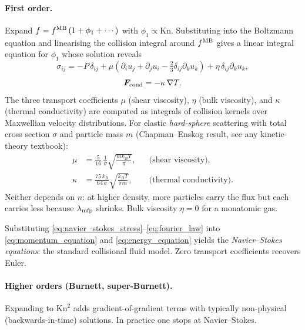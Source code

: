 \documentclass[12pt]{article}
\renewcommand{\vec}[1]{\bm{#1}}
\begin{document}
\paragraph{First order.}  Expand $f = f^{\rm MB}\,(1 + \phi_1 + \cdots)$
with $\phi_1 \propto \mathrm{Kn}$.  Substituting into the Boltzmann
equation and linearising the collision integral around
$f^{\rm MB}$ gives a linear integral equation for $\phi_1$ whose
solution reveals
%
\begin{equation}
  \sigma_{ij} = -P\,\delta_{ij}
    + \mu\!\left(\partial_i u_j + \partial_j u_i
                - \tfrac{2}{3}\delta_{ij}\partial_k u_k\right)
    + \eta\,\delta_{ij}\partial_k u_k,
  \label{eq:navier_stokes_stress}
\end{equation}
%
%
\begin{equation}
  \vec F_{\rm cond} = -\kappa\,\nabla T.
  \label{eq:fourier_law}
\end{equation}
%
The three transport coefficients $\mu$ (shear viscosity),
$\eta$ (bulk viscosity), and $\kappa$ (thermal conductivity) are
computed as integrals of collision kernels over Maxwellian velocity
distributions.  For elastic \emph{hard-sphere} scattering with total
cross section $\sigma$ and particle mass $m$
(Chapman--Enskog result, see any kinetic-theory textbook):
%
\begin{align}
  \mu &= \frac{5}{16}\,\frac{1}{\sigma}\sqrt{\frac{m k_B T}{\pi}},
    &&\text{(shear viscosity)},\\
  \kappa &= \frac{75\,k_B}{64\,\sigma}
             \sqrt{\frac{k_B T}{\pi m}},
    &&\text{(thermal conductivity)}.
  \label{eq:CE_transport}
\end{align}
%
Neither depends on $n$: at higher density, more particles carry the
flux but each carries less because $\lambda_{\rm mfp}$ shrinks.  Bulk
viscosity $\eta = 0$ for a monatomic gas.

Substituting \eqref{eq:navier_stokes_stress}--\eqref{eq:fourier_law}
into \eqref{eq:momentum_equation} and \eqref{eq:energy_equation}
yields the \emph{Navier--Stokes equations}: the standard collisional
fluid model.  Zero transport coefficients recovers Euler.

\paragraph{Higher orders (Burnett, super-Burnett).}  Expanding to
$\mathrm{Kn}^2$ adds gradient-of-gradient terms with typically
non-physical (backwards-in-time) solutions.  In practice one stops at
Navier--Stokes.
\end{document}
